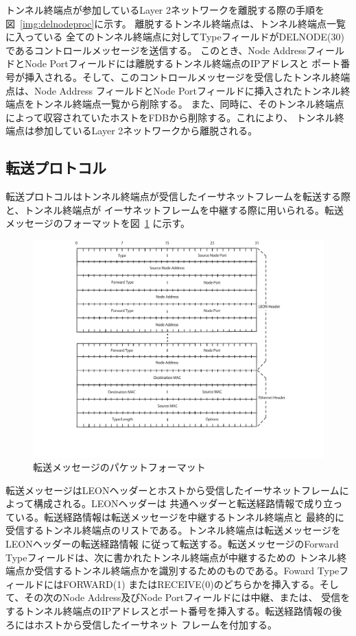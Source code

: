 トンネル終端点が参加しているLayer 2ネットワークを離脱する際の手順を図~\ref{img:delnodeproc}に示す。
離脱するトンネル終端点は、トンネル終端点一覧に入っている
全てのトンネル終端点に対してTypeフィールドがDELNODE(30)であるコントロールメッセージを送信する。
このとき、Node AddressフィールドとNode Portフィールドには離脱するトンネル終端点のIPアドレスと
ポート番号が挿入される。そして、このコントロールメッセージを受信したトンネル終端点は、Node Address
フィールドとNode Portフィールドに挿入されたトンネル終端点をトンネル終端点一覧から削除する。
また、同時に、そのトンネル終端点によって収容されていたホストをFDBから削除する。これにより、
トンネル終端点は参加しているLayer 2ネットワークから離脱される。

\subsection{転送プロトコル}
\label{solv:fowardprotocol}

転送プロトコルはトンネル終端点が受信したイーサネットフレームを転送する際と、トンネル終端点が
イーサネットフレームを中継する際に用いられる。転送メッセージのフォーマットを図~\ref{img:forwardheader}
に示す。

\begin{figure}[h]
	\begin{center}
		\includegraphics[scale=1.0]{./img/forwardheader}
		\caption{転送メッセージのパケットフォーマット}
		\label{img:forwardheader}
	\end{center}
\end{figure}

転送メッセージはLEONヘッダーとホストから受信したイーサネットフレームによって構成される。LEONヘッダーは
共通ヘッダーと転送経路情報で成り立っている。転送経路情報は転送メッセージを中継するトンネル終端点と
最終的に受信するトンネル終端点のリストである。トンネル終端点は転送メッセージをLEONヘッダーの転送経路情報
に従って転送する。転送メッセージのForward Typeフィールドは、次に書かれたトンネル終端点が中継するための
トンネル終端点か受信するトンネル終端点かを識別するためのものである。Foward TypeフィールドにはFORWARD(1)
またはRECEIVE(0)のどちらかを挿入する。そして、その次のNode Address及びNode Portフィールドには中継、または、
受信をするトンネル終端点のIPアドレスとポート番号を挿入する。転送経路情報の後ろにはホストから受信したイーサネット
フレームを付加する。

